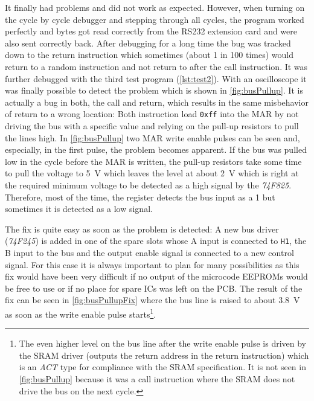 It finally had problems and did not work as expected.
However, when turning on the cycle by cycle debugger and stepping through all cycles, the program worked perfectly and bytes got read correctly from the RS232 extension card and were also sent correctly back.
After debugging for a long time the bug was tracked down to the return instruction which sometimes (about 1 in 100 times) would return to a random instruction and not return to after the call instruction.
It was further debugged with the third test program (\cref{lst:test2}).
With an oscilloscope it was finally possible to detect the problem which is shown in \cref{fig:busPullup}.
It is actually a bug in both, the call and return, which results in the same misbehavior of return to a wrong location:
Both instruction load \texttt{0xff} into the \gls{MAR} by not driving the bus with a specific value and relying on the pull-up resistors to pull the lines high.
In \cref{fig:busPullup} two \gls{MAR} write enable pulses can be seen and, especially, in the first pulse, the problem becomes apparent.
If the bus was pulled low in the cycle before the \gls{MAR} is written, the pull-up resistors take some time to pull the voltage to \qty{5}{\volt} which leaves the level at about \qty{2}{\volt} which is right at the required minimum voltage to be detected as a high signal by the \emph{74F825}.
Therefore, most of the time, the register detects the bus input as a 1 but sometimes it is detected as a low signal.

The fix is quite easy as soon as the problem is detected:
A new bus driver (\emph{74F245}) is added in one of the spare slots whose A input is connected to \texttt{H1}, the B input to the bus and the output enable signal is connected to a new control signal.
For this case it is always important to plan for many possibilities as this fix would have been very difficult if no output of the microcode \glspl{EEPROM} would be free to use or if no place for spare \glspl{IC} was left on the \gls{PCB}.
The result of the fix can be seen in \cref{fig:busPullupFix} where the bus line is raised to about \qty{3.8}{\volt} as soon as the write enable pulse starts\footnote{The even higher level on the bus line after the write enable pulse is driven by the \gls{SRAM} driver (outputs the return address in the return instruction) which is an \emph{ACT} type for compliance with the \gls{SRAM} specification. It is not seen in \cref{fig:busPullup} because it was a call instruction where the \gls{SRAM} does not drive the bus on the next cycle.}.